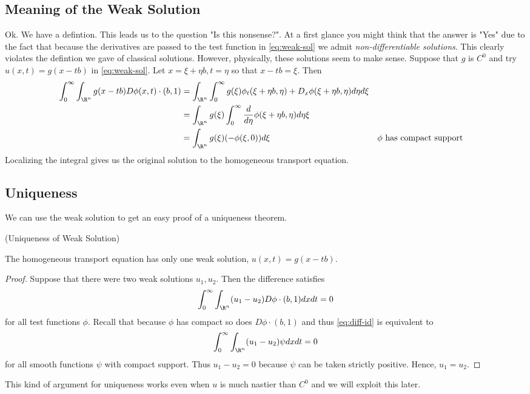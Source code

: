 \documentclass{bkcnotes}
\begin{document}
\subsection{Meaning of the Weak Solution}
Ok. We have a defintion. This leads us to the question "Is this
nonsense?". At a first glance you might think that the answer is "Yes"
due to the fact that because the derivatives are passed to the test
function in \eqref{eq:weak-sol} we admit \emph{non-differentiable
  solutions}. This clearly violates the defintion we gave of classical
solutions. However, physically, these solutions seem to make
sense. Suppose that $g$ is $C^0$ and try $u(x,t) = g(x-tb)$ in
\eqref{eq:weak-sol}. Let $x = \xi + \eta b, t = \eta$ so that $x - tb
= \xi$. Then
\begin{equation}
  \begin{aligned}
    \int_0^\infty \int_{\R^n} g(x-tb)D\phi(x,t)\cdot (b,1) &=
    \int_{\R^n} \int_0^\infty g(\xi ) \phi_t(\xi+\eta b,\eta) +
    D_x\phi(\xi+\eta b,\eta)d\eta d\xi \\ &=
    \int_{\R^n}g(\xi)\int_0^\infty \frac{d}{d\eta}\phi(\xi+\eta
    b,\eta)d\eta\xi \\ &=
    \int_{\R^n}g(\xi)(-\phi(\xi,0))d\xi && \phi \text{ has compact support}
  \end{aligned}
\end{equation}
Localizing the integral gives us the original solution to the
homogeneous transport equation.

\subsection{Uniqueness}
We can use the weak solution to get an easy proof of a uniqueness
theorem.

\begin{nthm}(Uniqueness of Weak Solution)

  The homogeneous transport equation has only one weak solution,
  $u(x,t) = g(x-tb)$.
\end{nthm}
\begin{proof}
  Suppose that there were two weak solutions $u_1,u_2$. Then the
  difference satisfies
  \begin{equation}
    \label{eq:diff-id}
    \int_0^\infty \int_{\R^n} (u_1 - u_2)D\phi\cdot (b,1)dxdt = 0
  \end{equation}
  for all test functions $\phi$. Recall that because $\phi$ has
  compact so does $D\phi\cdot (b,1)$ and thus \eqref{eq:diff-id} is
  equivalent to
  \begin{equation}
    \int_0^\infty \int_{\R^n} (u_1 - u_2)\psi dx dt = 0
  \end{equation}
  for all smooth functions $\psi$ with compact support. Thus $u_1 -
  u_2 = 0$ because $\psi$ can be taken strictly positive. Hence, $u_1
  = u_2$.
\end{proof}

This kind of argument for uniqueness works even when $u$ is much
nastier than $C^0$ and we will exploit this later.
\end{document}
